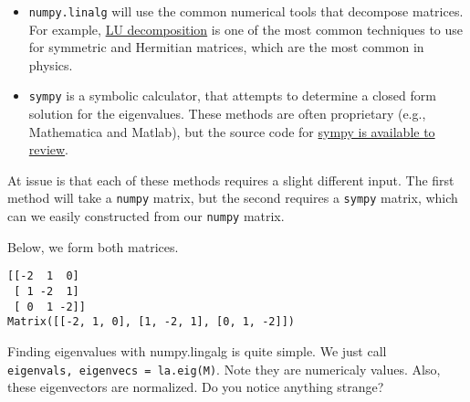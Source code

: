 \begin{itemize}
\tightlist
\item
  \texttt{numpy.linalg} will use the common numerical tools that
  decompose matrices. For example,
  \href{https://en.wikipedia.org/wiki/LU_decomposition}{LU
  decomposition} is one of the most common techniques to use for
  symmetric and Hermitian matrices, which are the most common in
  physics.
\item
  \texttt{sympy} is a symbolic calculator, that attempts to determine a
  closed form solution for the eigenvalues. These methods are often
  proprietary (e.g., Mathematica and Matlab), but the source code for
  \href{https://github.com/sympy/sympy}{sympy is available to review}.
\end{itemize}

At issue is that each of these methods requires a slight different
input. The first method will take a \texttt{numpy} matrix, but the
second requires a \texttt{sympy} matrix, which can we easily constructed
from our \texttt{numpy} matrix.

Below, we form both matrices.

\begin{Shaded}
\begin{Highlighting}[]
\OperatorTok{=}\NormalTok{ np.matrix([[}\OperatorTok{{-}}\NormalTok{, }\NormalTok{, }\NormalTok{], [}\NormalTok{, }\OperatorTok{{-}}\NormalTok{, }\NormalTok{], [}\NormalTok{, }\NormalTok{, }\OperatorTok{{-}}\NormalTok{]]) }
\OperatorTok{=}
\end{Highlighting}
\end{Shaded}

\begin{verbatim}
[[-2  1  0]
 [ 1 -2  1]
 [ 0  1 -2]]
Matrix([[-2, 1, 0], [1, -2, 1], [0, 1, -2]])
\end{verbatim}

Finding eigenvalues with numpy.lingalg is quite simple. We just call
\texttt{eigenvals,\ eigenvecs\ =\ la.eig(M)}. Note they are numericaly
values. Also, these eigenvectors are normalized. Do you notice anything
strange?

\begin{Shaded}
\begin{Highlighting}[]
\OperatorTok{=}
\end{Highlighting}
\end{Shaded}


